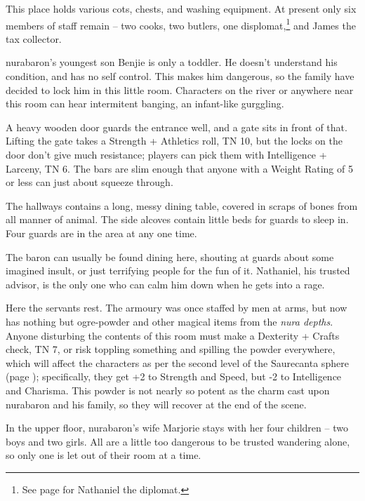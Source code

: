 
This place holds various cots, chests, and washing equipment.  At present only six members of staff remain -- two cooks, two butlers, one displomat,\footnote{See page \pageref{nathaniel} for Nathaniel the diplomat.} and James the tax collector.


\Gls{nurabaron}'s youngest son Benjie is only a toddler.  He doesn't understand his condition, and has no self control.  This makes him dangerous, so the family have decided to lock him in this little room.  Characters on the river or anywhere near this room can hear intermitent banging, an infant-like gurggling.


\deephobgoblin


A heavy wooden door guards the entrance well, and a gate sits in front of that.  Lifting the gate takes a Strength + Athletics roll, TN 10, but the locks on the door don't give much resistance; players can pick them with Intelligence + Larceny, TN 6.  The bars are slim enough that anyone with a Weight Rating of 5 or less can just about squeeze through.

The hallways contains a long, messy dining table, covered in scraps of bones from all manner of animal.  The side alcoves contain little beds for guards to sleep in.  Four guards are in the area at any one time.

The baron can usually be found dining here, shouting at guards about some imagined insult, or just terrifying people for the fun of it.  Nathaniel, his trusted advisor, is the only one who can calm him down when he gets into a rage.




Here the servants rest.  The armoury was once staffed by men at arms, but now has nothing but ogre-powder and other magical items from the \textit{nura depths}.  Anyone disturbing the contents of this room must make a Dexterity + Crafts check, TN 7, or risk toppling something and spilling the powder everywhere, which will affect the characters as per the second level of the Saurecanta sphere (page \pageref{saurecanta}); specifically, they get +2 to Strength and Speed, but -2 to Intelligence and Charisma.  This powder is not nearly so potent as the charm cast upon \gls{nurabaron} and his family, so they will recover at the end of the scene.

In the upper floor, \gls{nurabaron}'s wife Marjorie stays with her four children -- two boys and two girls.  All are a little too dangerous to be trusted wandering alone, so only one is let out of their room at a time.


\ogre


